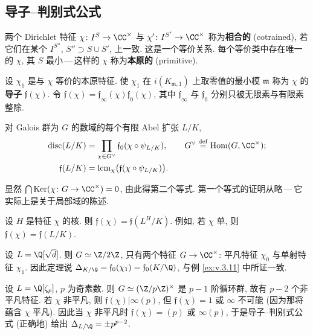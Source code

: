 \subsection*{导子--判别式公式}

两个 Dirichlet 特征 $\chi\colon I^S\to\CC^{\times}$ 与 $\chi'\colon I^{S'}\to\CC^{\times}$ 称为\textbf{相合的} (cotrained), 若它们在某个 $I^{S''}$, $S''\supset S\cup S'$, 上一致. 这是一个等价关系. 每个等价类中存在唯一的 $\chi$, 其 $S$ 最小\,---\,这样的 $\chi$ 称为\textbf{本原的} (primitive).

设 $\chi_1$ 是与 $\chi$ 等价的本原特征. 使 $\chi_1$ 在 $i(K_{\mathfrak{m},1})$ 上取零值的最小模 $\mathfrak{m}$ 称为 $\chi$ 的\textbf{导子} $\mathfrak{f}(\chi)$. 令 $\mathfrak{f}(\chi)=\mathfrak{f}_\infty(\chi)\mathfrak{f}_0(\chi)$, 其中 $\mathfrak{f}_\infty$ 与 $\mathfrak{f}_0$ 分别只被无限素与有限素整除.

\begin{theorem}[F\"uhrerdiskriminantenproduktformel]\label{thm:v.3.27}
对 Galois 群为 $G$ 的数域的每个有限 Abel 扩张 $L/K$,
\begin{align*}
\mathrm{disc}(L/K)&=\prod_{\chi\in G^{\vee}}\mathfrak{f}_0(\chi\circ\psi_{L/K}),\qquad G^{\vee}\overset{\mathrm{def}}{=}\mathrm{Hom}(G,\CC^{\times});\\
\mathfrak{f}(L/K)&=\mathrm{lcm}_{\chi}\bigl(\mathfrak{f}(\chi\circ\psi_{L/K})\bigr).
\end{align*}
\end{theorem}

显然 $\bigcap\mathrm{Ker}(\chi\colon G\to\CC^{\times})=0$, 由此得第二个等式. 第一个等式的证明从略\,---\,它实际上是关于局部域的陈述.

\begin{remark}\label{rem:v.3.28}
设 $H$ 是特征 $\chi$ 的核. 则 $\mathfrak{f}(\chi)=\mathfrak{f}(L^H/K)$. 例如, 若 $\chi$ 单, 则 $\mathfrak{f}(\chi)=\mathfrak{f}(L/K)$.
\end{remark}

\begin{example}\label{ex:v.3.29}
设 $L=\Q[\sqrt{d}]$. 则 $G\simeq\Z/2\Z$, 只有两个特征 $G\to\CC^{\times}$: 平凡特征 $\chi_0$ 与单射特征 $\chi_1$. 因此定理说 $\Delta_{K/\Q}=\mathfrak{f}_0(\chi_1)=\mathfrak{f}_0(K/\Q)$, 与例 \ref{ex:v.3.11} 中所证一致.
\end{example}

\begin{example}\label{ex:v.3.30}
设 $L=\Q[\zeta_p]$, $p$ 为奇素数. 则 $G\simeq(\Z/p\Z)^{\times}$ 是 $p-1$ 阶循环群, 故有 $p-2$ 个非平凡特征. 若 $\chi$ 非平凡, 则 $\mathfrak{f}(\chi)|\infty(p)$, 但 $\mathfrak{f}(\chi)=1$ 或 $\infty$ 不可能 (因为那将蕴含 $\chi$ 平凡). 因此当 $\chi$ 非平凡时 $\mathfrak{f}(\chi)=(p)$ 或 $\infty(p)$, 于是导子--判别式公式 (正确地) 给出 $\Delta_{L/\Q}=\pm p^{p-2}$.
\end{example}

